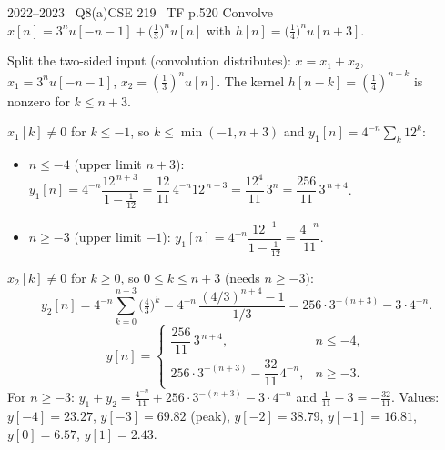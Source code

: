 \begin{qcard}{2022--2023 \textbullet\ Q8(a)}{CSE 219 \textbullet\ TF p.5}{20}
Convolve $x[n]=3^nu[-n-1]+\big(\tfrac13\big)^nu[n]$ with $h[n]=\big(\tfrac14\big)^nu[n+3]$.
\end{qcard}
\begin{solution}
Split the two-sided input (convolution distributes): $x=x_1+x_2$, $x_1=3^nu[-n-1]$, $x_2=(\frac13)^nu[n]$. The kernel $h[n-k]=(\tfrac14)^{n-k}$ is nonzero for $k\le n+3$.

 $x_1[k]\ne0$ for $k\le-1$, so $k\le\min(-1,n+3)$ and $y_1[n]=4^{-n}\sum_k12^k$:
\begin{itemize}[leftmargin=1.4em,itemsep=2pt]
\item $n\le-4$ (upper limit $n+3$): $y_1[n]=4^{-n}\dfrac{12^{\,n+3}}{1-\frac1{12}}=\dfrac{12}{11}\,4^{-n}12^{\,n+3}=\dfrac{12^4}{11}\,3^{n}=\dfrac{256}{11}\,3^{\,n+4}$.
\item $n\ge-3$ (upper limit $-1$): $y_1[n]=4^{-n}\dfrac{12^{-1}}{1-\frac1{12}}=\dfrac{4^{-n}}{11}$.
\end{itemize}

 $x_2[k]\ne0$ for $k\ge0$, so $0\le k\le n+3$ (needs $n\ge-3$):
\[y_2[n]=4^{-n}\sum_{k=0}^{n+3}\Big(\tfrac43\Big)^k=4^{-n}\,\frac{(4/3)^{n+4}-1}{1/3}=256\cdot3^{-(n+3)}-3\cdot4^{-n}.\]
\[
y[n]=\begin{cases}\dfrac{256}{11}\,3^{\,n+4},&n\le-4,\\[8pt]256\cdot3^{-(n+3)}-\dfrac{32}{11}\,4^{-n},&n\ge-3.\end{cases}
\]
For $n\ge-3$: $y_1+y_2=\frac{4^{-n}}{11}+256\cdot3^{-(n+3)}-3\cdot4^{-n}$ and $\frac1{11}-3=-\frac{32}{11}$. Values: $y[-4]=23.27$, $y[-3]=69.82$ (peak), $y[-2]=38.79$, $y[-1]=16.81$, $y[0]=6.57$, $y[1]=2.43$.
\begin{center}
\end{center}
\end{solution}


